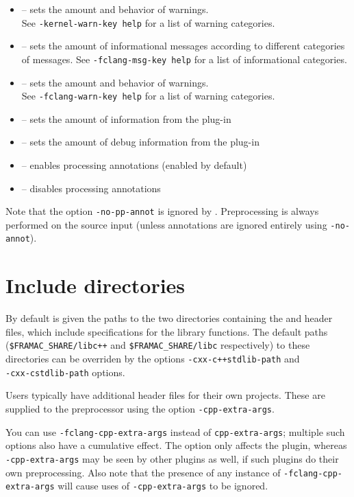 \begin{itemize}
	\item {} -- sets the amount and behavior of warnings.\\ See \lstinline|-kernel-warn-key help| for a list of warning categories.
	\item {} -- sets the amount of informational messages according to different categories of messages.
See \lstinline|-fclang-msg-key help| for a list of informational categories.
	\item {} -- sets the amount and behavior of warnings.\\ See \lstinline|-fclang-warn-key help| for a list of warning categories.
	\item {} -- sets the amount of information from the \fclang plug-in
	\item {} -- sets the amount of debug information from the \fclang plug-in
	\item {} -- enables processing \acslpp annotations (enabled by default)
	\item {} -- disables processing \acslpp annotations
\end{itemize}

Note that the \framac option \verb|-no-pp-annot| is ignored by \fclang. Preprocessing is always performed on the source input (unless annotations are ignored entirely using \verb|-no-annot|).
\section{Include directories}

By default \irg is given the paths to the two directories containing the \fcl and \fc header files, which include \acslpp specifications for the \cpp library functions. The default paths (\verb|$FRAMAC_SHARE/libc++| and
\verb|$FRAMAC_SHARE/libc| respectively) to these directories
can be overriden by the \fcl options \lstinline|-cxx-c++stdlib-path| and\\
 \lstinline|-cxx-cstdlib-path| options.

Users typically have additional header files for their own projects. These are supplied to the \fcl preprocessor using the option \lstinline|-cpp-extra-args|.

You can use \lstinline|-fclang-cpp-extra-args| instead of \lstinline|cpp-extra-args|; multiple such options also have a cumulative effect. 
The \fcl option only affects the \fcl plugin, whereas 
\lstinline|-cpp-extra-args| may be seen by other plugins as well, if such plugins do their own preprocessing. Also note that the presence of any instance of \lstinline|-fclang-cpp-extra-args| will cause uses of \lstinline|-cpp-extra-args| to be ignored. 

